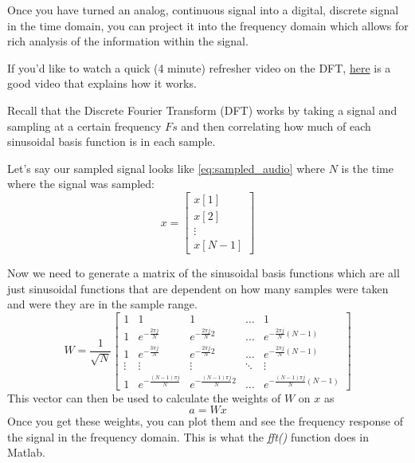 \documentclass{tufte-handout}
\begin{document}
Once you have turned an analog, continuous signal into a digital, discrete signal in the time domain, you can project it into the frequency domain which allows for rich analysis of the information within the signal. 

If you'd like to watch a quick (4 minute) refresher video on the DFT, \href{https://www.youtube.com/watch?v=h6QJLx22zrE}{here} is a good video that explains how it works.

Recall that the Discrete Fourier Transform (DFT) works by taking a signal and sampling at a certain frequency $Fs$ and then correlating how much of each sinusoidal basis function is in each sample. 

Let's say our sampled signal looks like \ref{eq:sampled_audio} where $N$ is the time where the signal was sampled:
\begin{equation}\label{eq:sampled_audio}
    x=
\begin{bmatrix}
    x[1]       \\
    x[2]       \\
    \vdots \\
    x[N-1]
\end{bmatrix}
\end{equation}

Now we need to generate a matrix of the sinusoidal basis functions which are all just sinusoidal functions that are dependent on how many samples were taken and were they are in the sample range.
\begin{equation}\label{eq:basis_fns}
    W=\dfrac{1}{\sqrt{N}}
\begin{bmatrix}
    1 & 1 & 1 & \dots  & 1 \\
    1 & e^{-\frac{2 \pi j}{N}} & e^{-\frac{2 \pi j}{N}2} & \dots  & e^{-\frac{2 \pi j}{N}(N-1)} \\
    1 & e^{-\frac{3 \pi j}{N}} & e^{-\frac{2 \pi j}{N}2} & \dots  & e^{-\frac{2 \pi j}{N}(N-1)} \\
    \vdots & \vdots & \vdots & \ddots & \vdots \\
    1 & e^{-\frac{(N-1) \pi j}{N}} & e^{-\frac{(N-1) \pi j}{N}2} & \dots  & e^{-\frac{(N-1) \pi j}{N}(N-1)}
\end{bmatrix}
\end{equation}
This vector can then be used to calculate the weights of $W$ on $x$ as
\begin{equation}
a = W x
\end{equation}
Once you get these weights, you can plot them and see the frequency response of the signal in the frequency domain. This is what the \textit{fft()} function does in Matlab.
\end{document}
